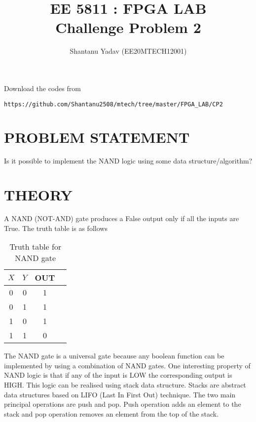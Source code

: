 \documentclass[journal,12pt,twocolumn]{IEEEtran}
\begin{document}
\renewcommand{\thefigure}{\theproblem}
\def\putbox#1#2#3{\makebox[0in][l]{\makebox[#1][l]{}\raisebox{\baselineskip}[0in][0in]{\raisebox{#2}[0in][0in]{#3}}}}
     \def\rightbox#1{\makebox[0in][r]{#1}}
     \def\centbox#1{\makebox[0in]{#1}}
     \def\topbox#1{\raisebox{-\baselineskip}[0in][0in]{#1}}
     \def\midbox#1{\raisebox{-0.5\baselineskip}[0in][0in]{#1}}
\vspace{3cm}
\title{
EE 5811 : FPGA LAB \\ Challenge Problem 2
}
\author{ Shantanu Yadav (EE20MTECH12001)}	
\maketitle
\newpage
\bigskip
\renewcommand{\thefigure}{\theenumi}
\renewcommand{\thetable}{\theenumi}
Download the codes from
\begin{lstlisting}
https://github.com/Shantanu2508/mtech/tree/master/FPGA_LAB/CP2
\end{lstlisting}

\section{PROBLEM STATEMENT}
Is it possible to implement the NAND logic using some data structure/algorithm?

\section{THEORY}
A NAND (NOT-AND) gate produces a False output only if all the inputs are True. The truth table is as follows
\begin{table}[h]
    \centering
    \begin{tabular}{|c|c|c|c|}
    \hline
    $X$&$Y$&OUT  \\
    \hline
    0&0&1\\
    0&1&1\\
    1&0&1\\
    1&1&0\\
    \hline
    \end{tabular}
    \caption{Truth table for NAND gate}
\end{table}
The NAND gate is a universal gate because any boolean function can be implemented by using a combination of NAND gates. One interesting property of NAND logic is that if any of the input is LOW the corresponding output is HIGH. This logic can be realised using stack data structure. Stacks are abstract data structures based on LIFO (Last In First Out) technique. The two main principal operations are push and pop. Push operation adds an element to the stack and pop operation removes an element from the top of the stack. \\
\end{document}
